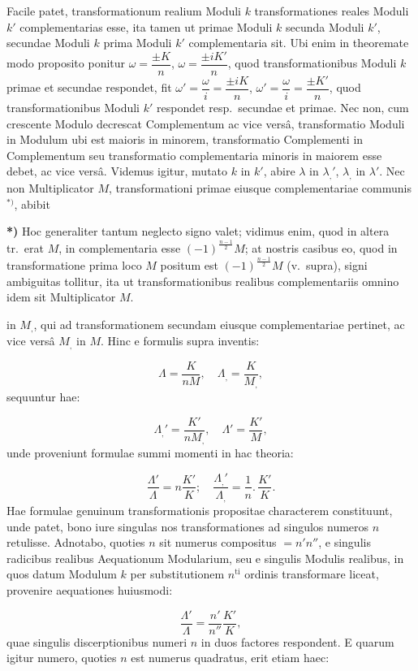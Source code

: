 \documentclass{article}
\begin{document}
Facile patet, transformationum realium Moduli $k$ transformationes reales Moduli $k'$ complementarias esse, ita tamen ut primae Moduli $k$ secunda Moduli $k'$, secundae Moduli $k$ prima Moduli $k'$ complementaria sit. Ubi enim in theoremate modo proposito ponitur $\omega=\dfrac{\pm K}{n}$, $\omega=\dfrac{\pm iK'}{n}$, quod transformationibus Moduli $k$ primae et secundae respondet, fit $\omega'=\dfrac{\omega}{i}=\dfrac{\pm iK}{n}$, $\omega'=\dfrac{\omega}{i}=\dfrac{\pm K'}{n}$, quod transformationibus Moduli $k'$ respondet resp.\ secundae et primae. Nec non, cum crescente Modulo decrescat Complementum ac vice versâ, transformatio Moduli in Modulum ubi est maioris in minorem, transformatio Complementi in Complementum seu transformatio complementaria minoris in maiorem esse debet, ac vice versâ. Videmus igitur, mutato $k$ in $k'$, abire $\lambda$ in $\lambda_{,}'$, $\lambda_{,}$ in $\lambda'$. Nec non Multiplicator $M$, transformationi primae eiusque complementariae communis ${}^{*)}$, abibit

\textbf{*)} Hoc generaliter tantum neglecto signo valet; vidimus enim, quod in altera tr.\ erat $M$, in complementaria esse $(-1)^{\frac{n-1}{2}}M$; at nostris casibus eo, quod in transformatione prima loco $M$ positum est $(-1)^{\frac{n-1}{2}}M$ (v.\ supra), signi ambiguitas tollitur, ita ut transformationibus realibus complementariis omnino idem sit Multiplicator $M$.

in $M_{,}$, qui ad transformationem secundam eiusque complementariae pertinet, ac vice versâ $M_{,}$ in $M$. Hinc e formulis supra inventis:

\[
\Lambda=\frac{K}{nM},\quad\Lambda_{,}=\frac{K}{M_{,}},
\]
sequuntur hae:

\[
\Lambda_{,}'=\frac{K'}{nM_{,}},\quad\Lambda'=\frac{K'}{M},
\]
unde proveniunt formulae summi momenti in hac theoria:

\[
\frac{\Lambda'}{\Lambda}=n\frac{K'}{K};\quad\frac{\Lambda_{,}'}{\Lambda_{,}}=\frac{1}{n}.\,\frac{K'}{K}.
\]
Hae formulae genuinum transformationis propositae characterem constituunt, unde patet, bono iure singulas nos transformationes ad singulos numeros $n$ retulisse. Adnotabo, quoties $n$ sit numerus compositus $=n'n''$, e singulis radicibus realibus Aequationum Modularium, seu e singulis Modulis realibus, in quos datum Modulum $k$ per substitutionem $n^{\mathrm{ti}}$ ordinis transformare liceat, provenire aequationes huiusmodi:

\[
\frac{\Lambda'}{\Lambda}=\frac{n'}{n''}\frac{K'}{K},
\]
quae singulis discerptionibus numeri $n$ in duos factores respondent. E quarum igitur numero, quoties $n$ est numerus quadratus, erit etiam haec:
\end{document}
